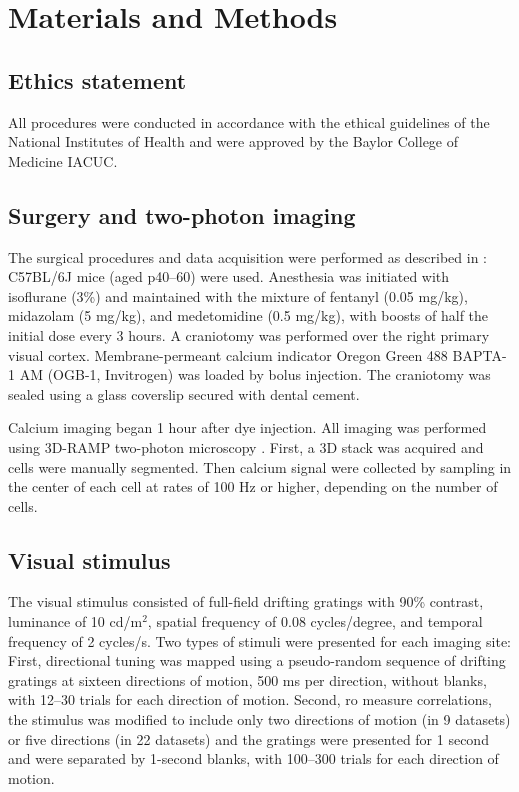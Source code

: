 \section*{Materials and Methods}

\subsection*{Ethics statement}
All procedures were conducted in accordance with the ethical guidelines of the National Institutes of Health and were approved by the Baylor College of Medicine IACUC.

\subsection*{Surgery and two-photon imaging}
The surgical procedures and data acquisition were performed as described in \cite{Cotton:2013}: C57BL/6J mice (aged p40--60) were used. Anesthesia was initiated with isoflurane (3\%) and maintained with the mixture of fentanyl (0.05 mg/kg), midazolam (5 mg/kg), and medetomidine (0.5 mg/kg), with boosts of half the initial dose every 3 hours.  A craniotomy was performed over the right primary visual cortex.  Membrane-permeant calcium indicator Oregon Green 488 BAPTA-1 AM (OGB-1, Invitrogen) was loaded by bolus injection.  The craniotomy was sealed using a glass coverslip secured with dental cement.

Calcium imaging began 1 hour after dye injection.  All imaging was performed using 3D-RAMP two-photon microscopy \cite{Cotton:2013}. First, a 3D stack was acquired and cells were manually segmented. Then calcium signal were collected by sampling in the center of each cell at rates of 100 Hz or higher, depending on the number of cells.

\subsection*{Visual stimulus}
The visual stimulus consisted of full-field drifting gratings with 90\% contrast, luminance of 10 cd/m$^2$, spatial frequency of 0.08 cycles/degree, and temporal frequency of 2 cycles/s. Two types of stimuli were presented for each imaging site: First, directional tuning was mapped using a pseudo-random sequence of drifting gratings at sixteen directions of motion, 500 ms per direction, without blanks, with 12--30 trials for each direction of motion.  Second, ro measure correlations, the stimulus was modified to include only two directions of motion (in 9 datasets) or five directions (in 22 datasets) and the gratings were presented for 1 second and were separated by 1-second blanks, with 100--300 trials for each direction of motion.

